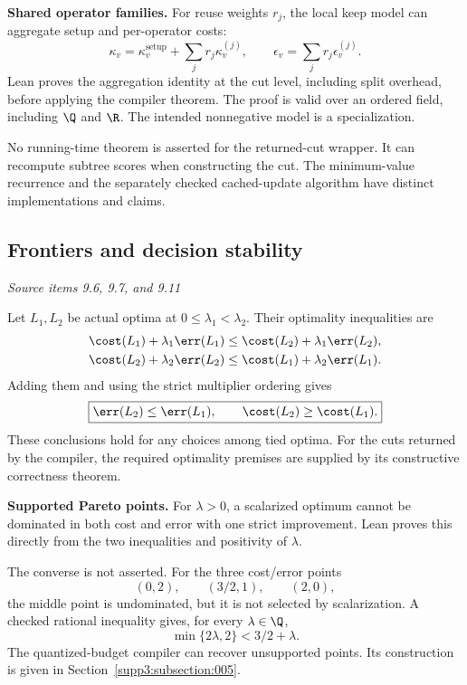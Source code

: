 \textbf{Shared operator families.} For reuse weights $r_j$, the local keep model can aggregate setup and per-operator costs:
\[
\kappa_v=\kappa_v^{\mathrm{setup}}+\sum_jr_j\kappa_v^{(j)},
\qquad \epsilon_v=\sum_jr_j\epsilon_v^{(j)}.
\]
Lean proves the aggregation identity at the cut level, including split overhead, before applying the compiler theorem. The proof is valid over an ordered field, including $\Q$ and $\R$. The intended nonnegative model is a specialization.

No running-time theorem is asserted for the returned-cut wrapper. It can recompute subtree scores when constructing the cut. The minimum-value recurrence and the separately checked cached-update algorithm have distinct implementations and claims.



\subsection{Frontiers and decision stability}\label{supp2:subsection:002}\textit{Source items 9.6, 9.7, and 9.11}\par
Let $L_1,L_2$ be actual optima at $0\leq\lambda_1<\lambda_2$. Their optimality inequalities are
\begin{align*}
\cost(L_1)+\lambda_1\err(L_1)&\leq\cost(L_2)+\lambda_1\err(L_2),\\
\cost(L_2)+\lambda_2\err(L_2)&\leq\cost(L_1)+\lambda_2\err(L_1).
\end{align*}
Adding them and using the strict multiplier ordering gives
\[
\boxed{\err(L_2)\leq\err(L_1),\qquad \cost(L_2)\geq\cost(L_1).}
\]
These conclusions hold for any choices among tied optima. For the cuts returned by the compiler, the required optimality premises are supplied by its constructive correctness theorem.

\textbf{Supported Pareto points.} For $\lambda>0$, a scalarized optimum cannot be dominated in both cost and error with one strict improvement. Lean proves this directly from the two inequalities and positivity of $\lambda$.

The converse is not asserted. For the three cost/error points
\[
(0,2),\qquad (3/2,1),\qquad (2,0),
\]
the middle point is undominated, but it is not selected by scalarization. A checked rational inequality gives, for every $\lambda\in\Q$,
\[
\min\{2\lambda,2\}<3/2+\lambda.
\]
The quantized-budget compiler can recover unsupported points. Its construction is given in Section~\ref{supp3:subsection:005}.

